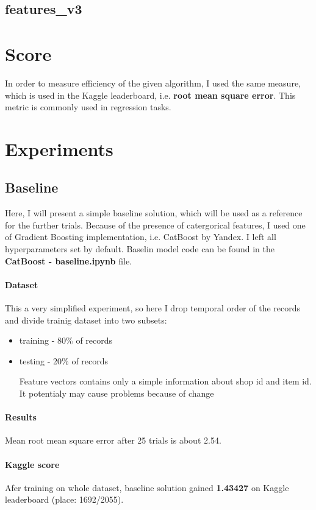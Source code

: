 \documentclass[12pt,twoside,a4paper]{memoir}
\begin{document}
\subsection{features\_v3} \label{featv3}

\section{Score}
In order to measure efficiency of the given algorithm, I used the same measure, which is used in the Kaggle leaderboard, i.e. \textbf{root mean square error}. This metric is commonly used in regression tasks. 


\section{Experiments}

\subsection{Baseline}
Here, I will present a simple baseline solution, which will be used as a reference for the further trials. Because of the presence of catergorical features, I used one of Gradient Boosting implementation, i.e. CatBoost by Yandex. I left all hyperparameters set by default. Baselin model code can be found in the \textbf{CatBoost - baseline.ipynb} file.

\paragraph{Dataset}
This a very simplified experiment, so here I drop temporal order of the records and divide trainig dataset into two subsets:
\begin{itemize}
\item training - 80\% of records
\item testing - 20\% of records

Feature vectors contains only a simple information about shop id and item id. It potentialy may cause problems because of change

\end{itemize}

\paragraph{Results}
Mean root mean square error after 25 trials is about 2.54.

\paragraph{Kaggle score}
Afer training on whole dataset, baseline solution gained \textbf{1.43427} on Kaggle leaderboard (place: 1692/2055). 
\end{document}
